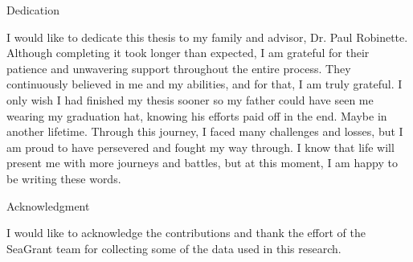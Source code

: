\newpage
\thispagestyle{plain}
\vspace*{1cm}
\begin{center}
{\Large Dedication}
\end{center}
\begin{center}
I would like to dedicate this thesis to my family and advisor, Dr. Paul Robinette. Although completing it took longer than expected, I am grateful for their patience and unwavering support throughout the entire process. They continuously believed in me and my abilities, and for that, I am truly grateful. I only wish I had finished my thesis sooner so my father could have seen me wearing my graduation hat, knowing his efforts paid off in the end. Maybe in another lifetime. Through this journey, I faced many challenges and losses, but I am proud to have persevered and fought my way through. I know that life will present me with more journeys and battles, but at this moment, I am happy to be writing these words.
\end{center}
\vspace*{1cm}
\begin{center}
{\Large Acknowledgment}
\end{center}
\begin{center}
I would like to acknowledge the contributions and thank the effort of the SeaGrant team for collecting some of the data used in this research.
\end{center}